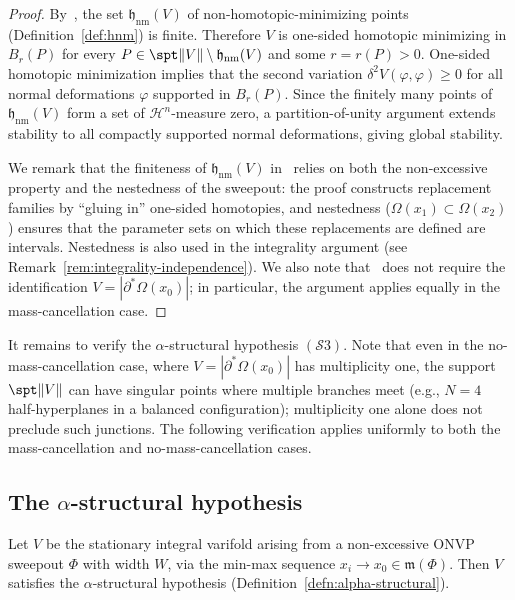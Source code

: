 \begin{proof}
By~\cite[Proposition~3.1]{CLS22}, the set $\mathfrak{h}_{\mathrm{nm}}(V)$ of non-homotopic-minimizing points (Definition~\ref{def:hnm}) is finite. Therefore $V$ is one-sided homotopic minimizing in $B_r(P)$ for every $P \in \spt\|V\| \setminus \mathfrak{h}_{\mathrm{nm}}(V)$ and some $r = r(P) > 0$. One-sided homotopic minimization implies that the second variation $\delta^2 V(\varphi, \varphi) \geq 0$ for all normal deformations $\varphi$ supported in $B_r(P)$. Since the finitely many points of $\mathfrak{h}_{\mathrm{nm}}(V)$ form a set of $\mathcal{H}^n$-measure zero, a partition-of-unity argument extends stability to all compactly supported normal deformations, giving global stability.

We remark that the finiteness of $\mathfrak{h}_{\mathrm{nm}}(V)$ in~\cite[Proposition~3.1]{CLS22} relies on both the non-excessive property and the nestedness of the sweepout: the proof constructs replacement families by ``gluing in'' one-sided homotopies, and nestedness ($\Omega(x_1) \subset \Omega(x_2)$) ensures that the parameter sets on which these replacements are defined are intervals. Nestedness is also used in the integrality argument (see Remark~\ref{rem:integrality-independence}). We also note that~\cite[Proposition~3.1]{CLS22} does not require the identification $V = |\partial^*\Omega(x_0)|$; in particular, the argument applies equally in the mass-cancellation case.
\end{proof}

It remains to verify the $\alpha$-structural hypothesis $(\mathcal{S}3)$. Note that even in the no-mass-cancellation case, where $V = |\partial^*\Omega(x_0)|$ has multiplicity one, the support $\spt\|V\|$ can have singular points where multiple branches meet (e.g., $N = 4$ half-hyperplanes in a balanced configuration); multiplicity one alone does not preclude such junctions. The following verification applies uniformly to both the mass-cancellation and no-mass-cancellation cases.

\subsection{The $\alpha$-structural hypothesis}\label{subsec:alpha-structural}

\begin{theorem}\label{thm:alpha-hypo}
    Let $V$ be the stationary integral varifold arising from a non-excessive ONVP sweepout $\Phi$
    with width $W$, via the min-max sequence $x_i \to x_0 \in \mathfrak{m}(\Phi)$. Then $V$ satisfies the $\alpha$-structural hypothesis (Definition~\ref{defn:alpha-structural}).
\end{theorem}

